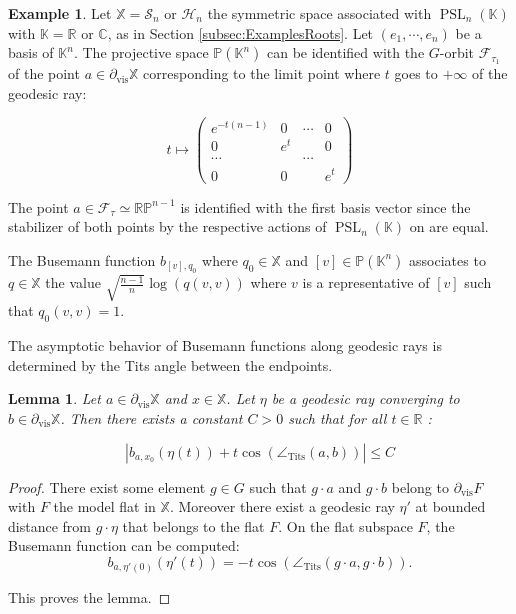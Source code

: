 \documentclass[reqno,10pt]{amsart}
\theoremstyle{plain}
\newtheorem{lem}[thm]{Lemma}
\theoremstyle{definition}
\newtheorem{exmp}[thm]{Example}
\theoremstyle{remark}
\newcommand{\type}{\tau}
\newcommand{\R}{\mathbb{R}}
\newcommand{\C}{\mathbb{C}}
\newcommand{\K}{\mathbb{K}}
\newcommand{\Tangle}{\angle_\text{Tits}}
\DeclareMathOperator{\vis}{vis}
\newcommand{\partialvis}{\partial_{\vis}}
\DeclareMathOperator{\PSL}{PSL}
\newcommand{\X}{\mathbb{X}}
\begin{document}
\begin{exmp}

Let $\X=\mathcal{S}_n$ or $\mathcal{H}_n$ the symmetric space associated with $\PSL_{n}(\K)$ with $\K=\R$ or $\C$, as in Section \ref{subsec:ExamplesRoots}. Let $(e_1,\cdots,e_n)$ be a basis of $\K^n$. The projective space $\mathbb{P}(\K^n)$ can be identified with the $G$-orbit $\mathcal{F}_{\type_1}$ of the point $a\in \partialvis \X$ corresponding to the limit point where $t$ goes to $+\infty$ of the geodesic ray:

$$t\mapsto
\begin{pmatrix}
e^{-t(n-1)} & 0 & \cdots& 0\\
0 & e^t &  & 0\\
\cdots &   & \cdots&  \\
0 & 0 &  &  e^t
\end{pmatrix} $$

The point $a\in \mathcal{F}_\type\simeq\mathbb{RP}^{n-1}$ is identified with the first basis vector since the stabilizer of both points by the respective actions of $\PSL_n(\K)$ on are equal.

\medskip

The Busemann function $b_{[v],q_0}$ where $q_0\in \X$ and $[v]\in \mathbb{P}(\K^n)$ associates to $q\in \X$ the value $\sqrt{\frac{n-1}{n}} \log(q(v,v))$ where $v$ is a representative of $[v]$ such that $q_0(v,v)=1$.
\end{exmp}

The asymptotic behavior of Busemann functions along geodesic rays is determined by the Tits angle between the endpoints.

\begin{lem}
\label{lem:asymptoticsBusemann}
Let $a\in \partial_{\vis}\X$ and $x\in \X$. Let $\eta$ be a geodesic ray converging to $b\in \partial_{\vis}\X$. Then there exists a constant $C>0$ such that for all $t\in \R$ :

$$ \left|b_{a,x_0}(\eta(t))+t\cos(\Tangle(a,b))\right|\leq C$$
\end{lem}

\begin{proof}
There exist some element $g\in G$ such that $g\cdot a$ and $g\cdot b$ belong to $\partial_{\vis}F$ with $F$ the model flat in $\X$. Moreover there exist a geodesic ray $\eta'$ at bounded distance from $g\cdot \eta$ that belongs to the flat $F$. On the flat subspace $F$, the Busemann function can be computed:
$$b_{a,\eta'(0)}(\eta'(t))=-t\cos(\Tangle(g\cdot a,g\cdot b)).$$ 

This proves the lemma.
\end{proof}
\end{document}
